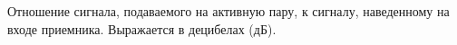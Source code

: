 Отношение сигнала, подаваемого на активную пару, к сигналу,
наведенному на входе приемника. Выражается в децибелах (дБ).